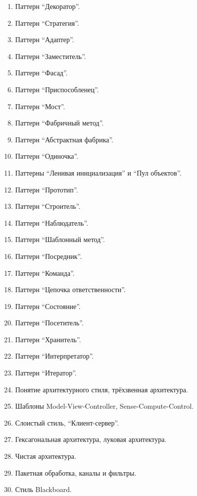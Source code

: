 \documentclass[a5paper]{article}
\begin{document}
\begin{enumerate}
    \item Паттерн \enquote{Декоратор}.
    \item Паттерн \enquote{Стратегия}.
    \item Паттерн \enquote{Адаптер}.
    \item Паттерн \enquote{Заместитель}.
    \item Паттерн \enquote{Фасад}.
    \item Паттерн \enquote{Приспособленец}.
    \item Паттерн \enquote{Мост}.
    \item Паттерн \enquote{Фабричный метод}.
    \item Паттерн \enquote{Абстрактная фабрика}.
    \item Паттерн \enquote{Одиночка}.
    \item Паттерны \enquote{Ленивая инициализация} и \enquote{Пул объектов}.
    \item Паттерн \enquote{Прототип}.
    \item Паттерн \enquote{Строитель}.
    \item Паттерн \enquote{Наблюдатель}.
    \item Паттерн \enquote{Шаблонный метод}.
    \item Паттерн \enquote{Посредник}.
    \item Паттерн \enquote{Команда}.
    \item Паттерн \enquote{Цепочка ответственности}.
    \item Паттерн \enquote{Состояние}.
    \item Паттерн \enquote{Посетитель}.
    \item Паттерн \enquote{Хранитель}.
    \item Паттерн \enquote{Интерпретатор}.
    \item Паттерн \enquote{Итератор}.
    \item Понятие архитектурного стиля, трёхзвенная архитектура.
    \item Шаблоны Model-View-Controller, Sense-Compute-Control.
    \item Слоистый стиль, \enquote{Клиент-сервер}.
    \item Гексагональная архитектура, луковая архитектура.
    \item Чистая архитектура.
    \item Пакетная обработка, каналы и фильтры. 
    \item Стиль Blackboard.

\end{enumerate}
\end{document}

